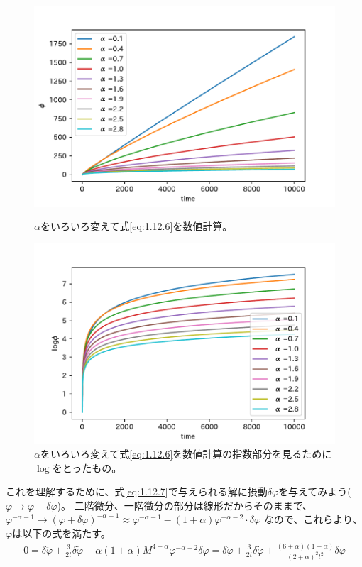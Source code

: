 \documentclass[11pt]{ltjsarticle}
\theoremstyle{plain}
\theoremstyle{break}
\begin{document}
\begin{figure}
  \centering
  \includegraphics{figure/Attracter_cal.pdf}
  \caption{$\alpha$をいろいろ変えて式\eqref{eq:1.12.6}を数値計算。}
  \label{fig:calculation_of_eq:1.12.6}
  \centering
  \includegraphics{figure/Attracter_cal_log.pdf}
  \caption{$\alpha$をいろいろ変えて式\eqref{eq:1.12.6}を数値計算の指数部分を見るために$\log$をとったもの。}
  \label{fig:calculation_of_eq:1.12.6_log}
\end{figure}%
これを理解するために、式\eqref{eq:1.12.7}で与えられる解に摂動$\delta \varphi$を与えてみよう($\varphi \to \varphi +\delta \varphi$)。
二階微分、一階微分の部分は線形だからそのままで、$\varphi^{-\alpha -1}\to(\varphi + \delta \varphi)^{-\alpha-1}\approx \varphi^{-\alpha -1} -(1+\alpha)\varphi^{-\alpha-2} \cdot \delta \varphi$
なので、これらより、$\varphi$は以下の式を満たす。
\begin{align}
  0=\delta \ddot{\varphi}+\frac{3}{2 t} \delta \dot{\varphi}+\alpha(1+\alpha) M^{4+\alpha} \varphi^{-\alpha-2} \delta \varphi=\delta \ddot{\varphi}+\frac{3}{2 t} \delta \dot{\varphi}+\frac{(6+\alpha)(1+\alpha)}{(2+\alpha)^{2} t^{2}} \delta \varphi
\end{align}%
\end{document}
